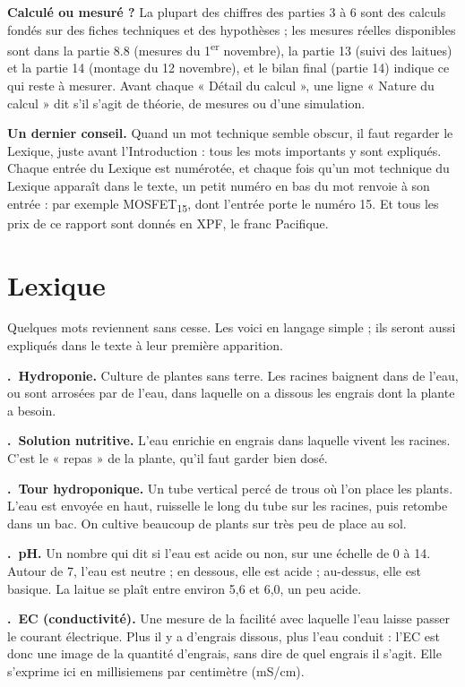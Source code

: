 \documentclass[11pt,a4paper]{article}
\newcounter{lex}
\newcommand{\terme}[2]{\par\medskip\noindent\stepcounter{lex}\textbf{\thelex.\ #1.} #2\par}
\newcommand{\ix}[1]{\textsubscript{#1}}
\begin{document}
\textbf{Calculé ou mesuré ?} La plupart des chiffres des parties 3 à 6 sont des calculs fondés sur des fiches techniques et des hypothèses ; les mesures réelles disponibles sont dans la partie 8.8 (mesures du 1\textsuperscript{er} novembre), la partie 13 (suivi des laitues) et la partie 14 (montage du 12 novembre), et le bilan final (partie 14) indique ce qui reste à mesurer. Avant chaque « Détail du calcul », une ligne « Nature du calcul » dit s'il s'agit de théorie, de mesures ou d'une simulation.

\textbf{Un dernier conseil.} Quand un mot technique semble obscur, il faut regarder le Lexique, juste avant l'Introduction : tous les mots importants y sont expliqués. Chaque entrée du Lexique est numérotée, et chaque fois qu'un mot technique du Lexique apparaît dans le texte, un petit numéro en bas du mot renvoie à son entrée : par exemple MOSFET\ix{15}, dont l'entrée porte le numéro 15. Et tous les prix de ce rapport sont donnés en XPF, le franc Pacifique.

\clearpage
\section*{Lexique}

Quelques mots reviennent sans cesse. Les voici en langage simple ; ils seront aussi expliqués dans le texte à leur première apparition.

\terme{Hydroponie}{Culture de plantes sans terre. Les racines baignent dans de l'eau, ou sont arrosées par de l'eau, dans laquelle on a dissous les engrais dont la plante a besoin.}

\terme{Solution nutritive}{L'eau enrichie en engrais dans laquelle vivent les racines. C'est le « repas » de la plante, qu'il faut garder bien dosé.}

\terme{Tour hydroponique}{Un tube vertical percé de trous où l'on place les plants. L'eau est envoyée en haut, ruisselle le long du tube sur les racines, puis retombe dans un bac. On cultive beaucoup de plants sur très peu de place au sol.}

\terme{pH}{Un nombre qui dit si l'eau est acide ou non, sur une échelle de 0 à 14. Autour de 7, l'eau est neutre ; en dessous, elle est acide ; au-dessus, elle est basique. La laitue se plaît entre environ 5,6 et 6,0, un peu acide.}

\terme{EC (conductivité)}{Une mesure de la facilité avec laquelle l'eau laisse passer le courant électrique. Plus il y a d'engrais dissous, plus l'eau conduit : l'EC est donc une image de la quantité d'engrais, sans dire de quel engrais il s'agit. Elle s'exprime ici en millisiemens par centimètre (mS/cm).}
\end{document}
